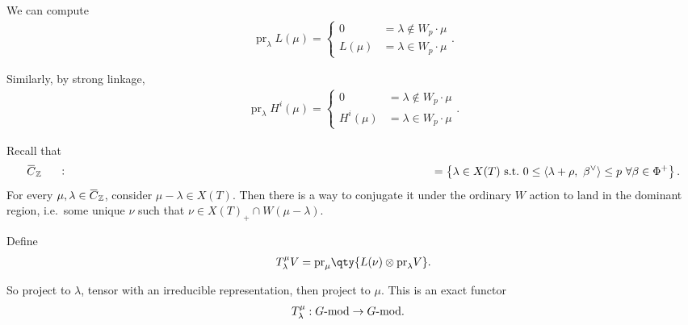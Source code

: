 \begin{example}

\begin{example}

We can compute
\begin{align*}   {\operatorname{pr}}_\lambda L(\mu) =  \begin{cases} 0 &= \lambda \not\in W_p \cdot \mu \\ L(\mu) &= \lambda \in W_p \cdot \mu \end{cases} .\end{align*}

Similarly, by strong linkage,
\begin{align*}   {\operatorname{pr}}_\lambda H^i(\mu) = \begin{cases} 0 &= \lambda \not\in W_p \cdot \mu \\ H^i(\mu) &= \lambda \in W_p \cdot \mu \end{cases} .\end{align*}

\end{example}

\end{example}

Recall that
\begin{align*}   \mkern 1.5mu\overline{\mkern-1.5muC\mkern-1.5mu}\mkern 1.5mu_{\mathbb{Z}}\mathrel{\vcenter{:}}=\left\{{ \lambda \in X(T) ~{\text{s.t.}}~ 0 \leq {\left\langle {\lambda + \rho},~{\beta^\vee} \right\rangle} \leq p \,\, \forall \beta\in\Phi^+ }\right\} .\end{align*}
For every
\(\mu, \lambda \in \mkern 1.5mu\overline{\mkern-1.5muC\mkern-1.5mu}\mkern 1.5mu_{\mathbb{Z}}\),
consider \(\mu - \lambda \in X(T)\). Then there is a way to conjugate it
under the ordinary \(W\) action to land in the dominant region,
i.e.~some unique \(\nu\) such that
\(\nu \in X(T)_+ \cap W(\mu - \lambda)\).

\begin{definition}

\begin{definition}

Define
\begin{align*}   T_\lambda^\mu V =  {\operatorname{pr}}_\mu \qty{ L(\nu) \otimes {\operatorname{pr}}_\lambda V } .\end{align*}

So project to \(\lambda\), tensor with an irreducible representation,
then project to \(\mu\). This is an exact functor
\begin{align*}   T_{\lambda}^\mu: G{\hbox{-}}\mathrm{mod} &\to G{\hbox{-}}\mathrm{mod} .\end{align*}

\end{definition}

\end{definition}

